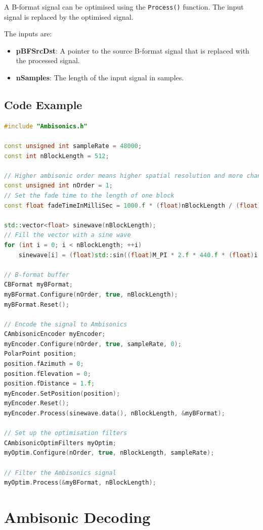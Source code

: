 \documentclass[12pt]{report}
\newcommand{\code}[1]{\texttt{#1}}
\begin{document}
A B-format signal can be optimised using the \code{Process()} function. The input signal is replaced by the optimised signal.

The inputs are:
\begin{itemize}
    \item \textbf{pBFSrcDst}: A pointer to the source B-format signal that is replaced with the processed signal.
    \item \textbf{nSamples}: The length of the input signal in samples.
\end{itemize}

\subsection{Code Example}
\begin{lstlisting}[language=C++]
#include "Ambisonics.h"

const unsigned int sampleRate = 48000;
const int nBlockLength = 512;

// Higher ambisonic order means higher spatial resolution and more channels required
const unsigned int nOrder = 1;
// Set the fade time to the length of one block
const float fadeTimeInMilliSec = 1000.f * (float)nBlockLength / (float)sampleRate;

std::vector<float> sinewave(nBlockLength);
// Fill the vector with a sine wave
for (int i = 0; i < nBlockLength; ++i)
    sinewave[i] = (float)std::sin((float)M_PI * 2.f * 440.f * (float)i / (float)sampleRate);

// B-format buffer
CBFormat myBFormat;
myBFormat.Configure(nOrder, true, nBlockLength);
myBFormat.Reset();

// Encode the signal to Ambisonics
CAmbisonicEncoder myEncoder;
myEncoder.Configure(nOrder, true, sampleRate, 0);
PolarPoint position;
position.fAzimuth = 0;
position.fElevation = 0;
position.fDistance = 1.f;
myEncoder.SetPosition(position);
myEncoder.Reset();
myEncoder.Process(sinewave.data(), nBlockLength, &myBFormat);

// Set up the optimisation filters
CAmbisonicOptimFilters myOptim;
myOptim.Configure(nOrder, true, nBlockLength, sampleRate);

// Filter the Ambisonics signal
myOptim.Process(&myBFormat, nBlockLength);
\end{lstlisting}

\section{Ambisonic Decoding}\label{AmbiDecoding}
\end{document}

